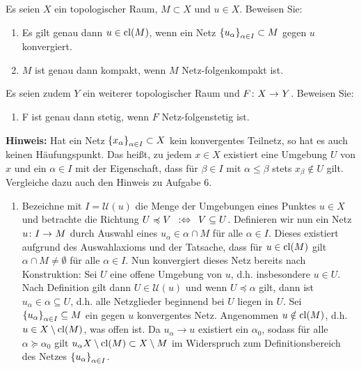 \begin{exercisePage}
	
	\begin{exercise}
		Es seien $X$ ein topologischer Raum, $M \subset X$ und $u \in X$. Beweisen Sie: 
		\begin{enumerate}
			\item Es gilt genau dann $u \in \operatorname{cl}(M)$, wenn ein Netz $\left\{ u_\alpha \right\}_{\alpha \in I} \subset M$ gegen $u$ konvergiert.
			\item $M$ ist genau dann kompakt, wenn $M$ Netz-folgenkompakt ist.
		\end{enumerate}
		Es seien zudem $Y$ ein weiterer topologischer Raum und $\abb{F}{X}{Y}$. Beweisen Sie:
		\begin{enumerate}[start=3]
			\item F ist genau dann stetig, wenn $F$ Netz-folgenstetig ist.
		\end{enumerate}
		\textbf{Hinweis:} Hat ein Netz $\left\{ x_\alpha \right\}_{\alpha \in I} \subset X$ kein konvergentes Teilnetz, so hat es auch keinen Häufungspunkt. Das heißt, zu jedem $x \in X$ existiert eine Umgebung $U$ von $x$ und ein $\alpha \in I$ mit der Eigenschaft, dass für $\beta \in I$ mit $\alpha \le \beta$ stets $x_\beta \notin U$ gilt. Vergleiche dazu auch den Hinweis zu Aufgabe 6.
	\end{exercise}

	\begin{enumerate}[leftmargin=\zulength, label=(zu \alph*)]
		\item \begin{proof-equivalence}
			\hinrichtung Bezeichne mit $I = \mathcal{U}(u)$ die Menge der Umgebungen eines Punktes $u \in X$ und betrachte die Richtung $U \preccurlyeq V \enskip \mathrel{:\Leftrightarrow} \enskip V \subseteq U$. Definieren wir nun ein Netz $\abb{u}{I}{M}$ durch Auswahl eines $u_\alpha \in \alpha \cap M$ für alle $\alpha \in I$. Dieses existiert aufgrund des Auswahlaxioms und der Tatsache, dass für $u \in \operatorname{cl}(M)$ gilt $\alpha \cap M \neq \emptyset$ für alle $\alpha \in I$. Nun konvergiert dieses Netz bereits nach Konstruktion: Sei $U$ eine offene Umgebung von $u$, d.h. insbesondere $u \in U$. Nach Definition gilt dann $U \in \mathcal{U}(u)$ und wenn $U \preccurlyeq \alpha$ gilt, dann ist $u_\alpha \in \alpha \subseteq U$, d.h. alle Netzglieder beginnend bei $U$ liegen in $U$. 
			\rueckrichtung Sei $\left\{ u_\alpha \right\}_{\alpha \in I} \subseteq M$ ein gegen $u$ konvergentes Netz. Angenommen $u \notin \operatorname{cl}(M)$, d.h. $u \in X \setminus \operatorname{cl}(M)$, was offen ist. Da $u_\alpha \to u$ existiert ein $\alpha_0$, sodass für alle $\alpha \succcurlyeq \alpha_0$ gilt $u_\alpha X \setminus \operatorname{cl}(M) \subset X \setminus M$ im Widerspruch zum Definitionsbereich des Netzes $\left\{ u_\alpha \right\}_{\alpha \in I}$.
		\end{proof-equivalence}
	

\end{enumerate}
\end{exercisePage}
